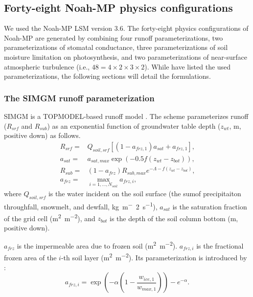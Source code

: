 \documentclass[essd]{copernicus}
\begin{document}
\subsection{Forty-eight Noah-MP physics configurations} \label{sec:data:noahmp}

We used the Noah-MP LSM version 3.6. The forty-eight physics configurations of
Noah-MP are generated by combining four runoff parameterizations, two
parameterizations of stomatal conductance, three parameterizations of soil
moisture limitation on photosynthesis, and two parameterizations of near-surface
atmospheric turbulence (i.e., \(48 = 4 \times 2 \times 3 \times 2\)). While
\citet[Table 1]{zheng2019WRR} have listed the used parameterizations, the
following sections will detail the formulations.

\subsubsection{The SIMGM runoff parameterization}

SIMGM is a TOPMODEL-based runoff model \citep{niu2007JGRA}. The scheme
parameterizes runoff (\(R_{srf}\) and \(R_{sub}\)) as an exponential function of
groundwater table depth (\(z_{wt}\), m, positive down) as follows.
\begin{align}
  R_{srf} = & Q_{soil,srf} [(1 - a_{frz,1}) a_{sat} + a_{frz,1} ]
  \text{,} \label{eq:SIMGM:rsrf} \\
  a_{sat} = & a_{sat,max} \exp(-0.5 f (z_{wt} - z_{bot}))
  \text{,} \label{eq:SIMGM:fsat} \\
  R_{sub} = & (1 - a_{frz}) R_{sub,max} e^{-\Lambda - f(z_{wt} - z_{bot})}
  \text{,} \label{eq:SIMGM:rsub} \\
  a_{frz} = & \max_{i=1,\dots,N_{soil}} a_{frz,i}
  \text{,} \label{eq:SIMGM:ffrzmax}
\end{align}
where \(Q_{soil,srf}\) is the water incident on the soil surface (the sumof
precipitaiton throughfall, snowmelt, and dewfall, \si{kg~m^-2~s^{-1}}),
\(a_{sat}\) is the saturation fraction of the grid cell (\si{m^2~m^{-2}}), and
\(z_{bot}\) is the depth of the soil column bottom (\si{m}, positive down).

\(a_{frz}\) is the impermeable area due to frozen soil (\si{m^2~m^{-2}}).
\(a_{frz,i}\) is the fractional frozen area of the \(i\)-th soil layer
(\si{m^2~m^{-2}}). Its parameterization is introduced by \citet{niu2006JH}:
\begin{equation}
  a_{frz,i} = \exp\left(-\alpha(1 - \frac{w_{ice,1}}{w_{max,1}})\right) -
  e^{-\alpha} \text{.}
\end{equation}
\end{document}
